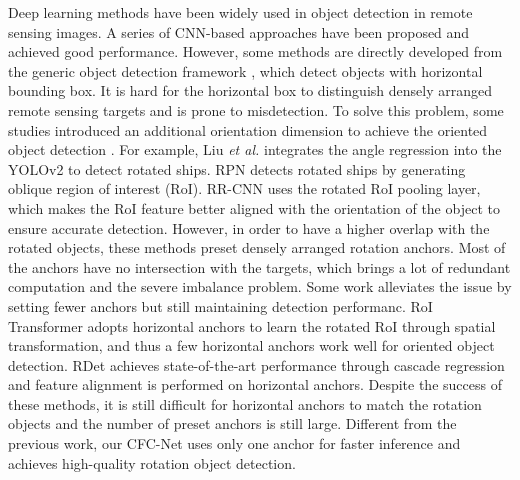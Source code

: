 \documentclass[journal]{IEEEtran}
\begin{document}
Deep learning methods have been widely used in object detection in remote sensing images. A series of CNN-based approaches have been proposed and achieved good performance. However, some methods are directly developed from the generic object detection framework \cite{deng2018multi, zhang2016weakly}, which detect objects with horizontal bounding box. It is hard for the horizontal box to distinguish densely arranged remote sensing targets and is prone to misdetection. To solve this problem, some studies introduced an additional orientation dimension to achieve the oriented object detection \cite{liu2018arbitrary, zhang2018toward, liu2017rotated}. For example,  Liu \textit{et al.} \cite{liu2018arbitrary} integrates the angle regression into the YOLOv2 \cite{redmon2017yolo9000} to detect rotated ships. RPN \cite{zhang2018toward} detects rotated ships by generating oblique region of interest (RoI). RR-CNN \cite{liu2017rotated} uses the rotated RoI pooling layer, which makes the RoI feature better aligned with the orientation of the object to ensure accurate detection. However, in order to have a higher overlap with the rotated objects, these methods preset densely arranged rotation anchors. Most of the anchors have no intersection with the targets, which brings a lot of redundant computation and the severe imbalance problem. Some work alleviates the issue by setting fewer anchors but still maintaining detection performanc\cite{ding2019learning, yang2019r3det}. RoI Transformer \cite{ding2019learning} adopts horizontal anchors to learn the rotated RoI through spatial transformation, and thus a few horizontal anchors work well for oriented object detection. RDet \cite{ yang2019r3det} achieves state-of-the-art performance through cascade regression and feature alignment is performed on horizontal anchors. Despite the success of these methods, it is still difficult for horizontal anchors to match the rotation objects and the number of preset anchors is still large. Different from the previous work, our CFC-Net uses only one anchor for faster inference and achieves high-quality rotation object detection.
\end{document}
